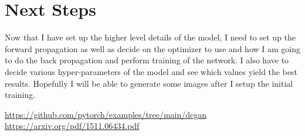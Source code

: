 \documentclass{article}
\begin{document}
\section{Next Steps}

Now that I have set up the higher level details of the model, I need to set up the forward propagation as well as decide on the optimizer to use and how I am going to do the back propagation and perform training of the network. I also have to decide various hyper-parameters of the model and see which values yield the best results. Hopefully I will be able to generate some images after I setup the initial training.

\begin{thebibliography}{1}

 \url{https://github.com/pytorch/examples/tree/main/dcgan}
 \url{https://arxiv.org/pdf/1511.06434.pdf}
\end{thebibliography}
\end{document}
